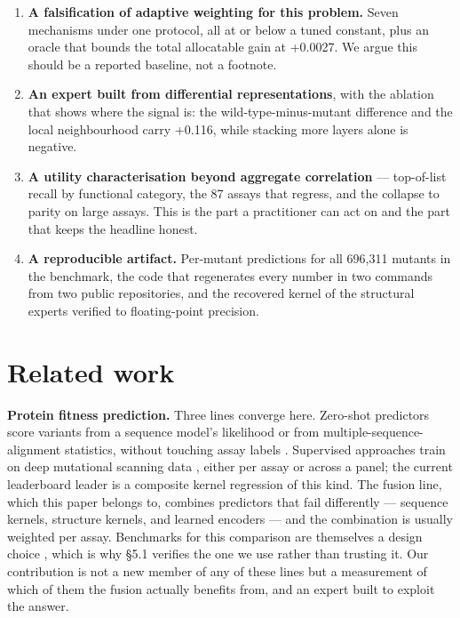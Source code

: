 \documentclass[sigconf,review,nonacm]{acmart}
\begin{document}
\begin{enumerate}
\def\labelenumi{\arabic{enumi}.}
\item
  \textbf{A falsification of adaptive weighting for this problem.} Seven mechanisms under one protocol, all
  at or below a tuned constant, plus an oracle that bounds the total allocatable gain at +0.0027. We
  argue this should be a reported baseline, not a footnote.
\item
  \textbf{An expert built from differential representations}, with the ablation that shows where the signal
  is: the wild-type-minus-mutant difference and the local neighbourhood carry +0.116, while stacking
  more layers alone is negative.
\item
  \textbf{A utility characterisation beyond aggregate correlation} --- top-of-list recall by functional
  category, the 87 assays that regress, and the collapse to parity on large assays. This is the part a
  practitioner can act on and the part that keeps the headline honest.
\item
  \textbf{A reproducible artifact.} Per-mutant predictions for all 696,311 mutants in the benchmark, the
  code that regenerates every number in two commands from two public repositories, and the recovered
  kernel of the structural experts verified to floating-point precision.
\end{enumerate}

\section{Related work}\label{related-work}

\textbf{Protein fitness prediction.} Three lines converge here. Zero-shot predictors score variants from a
sequence model's likelihood or from multiple-sequence-alignment statistics, without touching assay
labels \cite{esm1v,tranception,msatransformer}. Supervised approaches train on deep mutational scanning
data \cite{fowler2014,yang2019}, either per assay or across a panel; the current leaderboard leader is a
composite kernel regression of this kind. The fusion line, which this paper belongs to, combines
predictors that fail differently --- sequence kernels, structure kernels, and learned encoders --- and the
combination is usually weighted per assay. Benchmarks for this comparison are themselves a design
choice \cite{flip}, which is why \S5.1 verifies the one we use rather than trusting it. Our contribution is
not a new member of any of these lines but a measurement of which of them the fusion actually benefits
from, and an expert built to exploit the answer.
\end{document}
